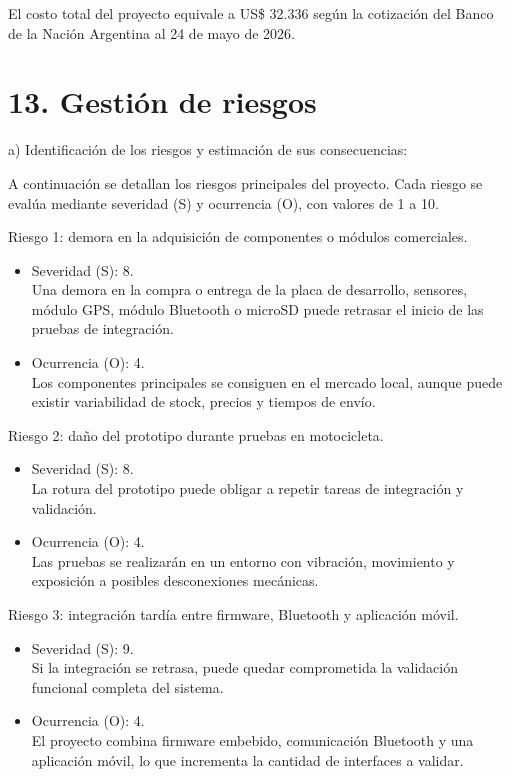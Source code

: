 \documentclass[
11pt, %
]{charter}
\begin{document}
El costo total del proyecto equivale a US\$ 32.336 según la cotización del Banco de la Nación Argentina al 24 de mayo de 2026.

\section{13. Gestión de riesgos}
\label{sec:riesgos}

a) Identificación de los riesgos y estimación de sus consecuencias:

A continuación se detallan los riesgos principales del proyecto. Cada riesgo se evalúa mediante severidad (S) y ocurrencia (O), con valores de 1 a 10.

Riesgo 1: demora en la adquisición de componentes o módulos comerciales.
\begin{itemize}
	\item Severidad (S): 8.\\
	Una demora en la compra o entrega de la placa de desarrollo, sensores, módulo GPS, módulo Bluetooth o microSD puede retrasar el inicio de las pruebas de integración.
	\item Ocurrencia (O): 4.\\
	Los componentes principales se consiguen en el mercado local, aunque puede existir variabilidad de stock, precios y tiempos de envío.
\end{itemize}

Riesgo 2: daño del prototipo durante pruebas en motocicleta.
\begin{itemize}
	\item Severidad (S): 8.\\
	La rotura del prototipo puede obligar a repetir tareas de integración y validación.
	\item Ocurrencia (O): 4.\\
	Las pruebas se realizarán en un entorno con vibración, movimiento y exposición a posibles desconexiones mecánicas.
\end{itemize}

Riesgo 3: integración tardía entre firmware, Bluetooth y aplicación móvil.
\begin{itemize}
	\item Severidad (S): 9.\\
	Si la integración se retrasa, puede quedar comprometida la validación funcional completa del sistema.
	\item Ocurrencia (O): 4.\\
	El proyecto combina firmware embebido, comunicación Bluetooth y una aplicación móvil, lo que incrementa la cantidad de interfaces a validar.
\end{itemize}
\end{document}

